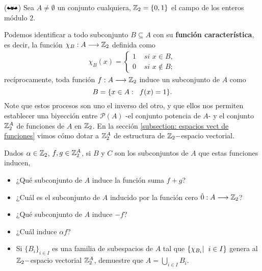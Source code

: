 \begin{ej}
($\mathbat$)
Sea $A \neq \emptyset$ un conjunto cualquiera, $\mathbb{Z}_{2} = \{ 0, 1 \}$
el campo de los enteros módulo $2$.

Podemos identificar a todo 
subconjunto $B \subseteq A$ con su \textbf{función característica},
es decir, la función $\chi_{B} : A \longrightarrow \mathbb{Z}_{2}$ definida como
\begin{align*}
 \chi_{B}(x)= \begin{cases}
 1 & \textit{ si } x \in B, \\
 0 & \textit{ si } x \not\in B;
 \end{cases}
 \end{align*}
recíprocamente, toda función $f : A \longrightarrow \mathbb{Z}_{2}$ 
induce un subconjunto de $A$ como 
\[
B = \{ x \in A : \hspace{0.2cm} f(x) = 1 \}.
\] 
Note que estos procesos son uno el inverso del otro, y que ellos
nos permiten establecer una biyección entre $\mathcal{P}(A)$
-el conjunto potencia de $A$- y el conjunto $\mathbb{Z}_{2}^{A}$
de funciones de $A$ en $\mathbb{Z}_{2}$. En la sección 
\ref{subsection: espacios vect de funciones}
vimos cómo dotar a $\mathbb{Z}_{2}^{A}$ de estructura de 
$\mathbb{Z}_{2}-$espacio vectorial.

Dados $\alpha \in \mathbb{Z}_{2}$,
$f, g \in \mathbb{Z}_{2}^{A}$, si $B$ y $C$ son los subconjuntos
de $A$ que estas funciones inducen,
\begin{itemize}
	\item ¿Qué subconjunto de $A$ induce la función suma $f+g$?
	\item ¿Cuál es el subconjunto de $A$ inducido por la función
	cero $\hat{0} : A \longrightarrow \mathbb{Z}_{2}$?
	\item ¿Qué subconjunto de $A$ induce $-f$?
	\item ¿Cuál induce $\alpha f$?
	\item Si $\{ B_{i} \}_{i \in I}$ es una familia de subespacios
	de $A$ tal que $\{ \chi_{B_{i}}  | \hspace{0.2cm} 
	i \in I \}$ genera al $\mathbb{Z}_{2}-$espacio vectorial 
	$\mathbb{Z}_{2}^{A}$, demuestre que $A = \bigcup_{i \in I} B_{i}$.
\end{itemize}
  
\end{ej}